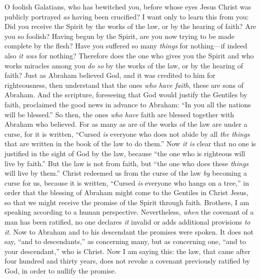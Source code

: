\begin{biblechapter} %
 O foolish Galatians, who has bewitched you, before whose eyes Jesus Christ was publicly portrayed \textit{as} having been crucified?
\verse I want only to learn this from you: Did you receive the Spirit by the works of the law, or by the hearing of faith?
\verse Are you so foolish? Having begun by the Spirit, are you now trying to be made complete by the flesh?
\verse Have you suffered so many \textit{things} for nothing—if indeed also \textit{it was} for nothing?
\verse Therefore does the one who gives you the Spirit and who works miracles among you \textit{do so} by the works of the law, or by the hearing of faith?
\verse Just as Abraham believed God, and it was credited to him for righteousness,
\verse then understand that the ones \textit{who have faith}, these are sons of Abraham.
\verse And the scripture, foreseeing that God would justify the Gentiles by faith, proclaimed the good news in advance to Abraham: “In you all the nations will be blessed.”
\verse So then, the ones \textit{who have} faith are blessed together with Abraham who believed.
\verse For as many as are of the works of the law are under a curse, for it is written, “Cursed \textit{is} everyone who does not abide by all \textit{the things} that are written in the book of the law to do them.”
\verse Now \textit{it is} clear that no one is justified in the sight of God by the law, because “the one who is righteous will live by faith.”
\verse But the law is not from faith, but “the one who does these \textit{things} will live by them.”
\verse Christ redeemed us from the curse of the law \textit{by} becoming a curse for us, because it is written, “Cursed \textit{is} everyone who hangs on a tree,”
\verse in order that the blessing of Abraham might come to the Gentiles in Christ Jesus, so that we might receive the promise of the Spirit through faith.
 Brothers, I am speaking according to a human perspective. Nevertheless, \textit{when} the covenant of a man has been ratified, no one declares \textit{it} invalid or adds additional provisions \textit{to it}.
\verse Now to Abraham and to his descendant the promises were spoken. It does not say, “and to descendants,” as concerning many, but as concerning one, “and to your descendant,” who is Christ.
\verse Now I am saying this: the law, that came after four hundred and thirty years, does not revoke a covenant previously ratified by God, in order to nullify the promise.

\end{biblechapter}
